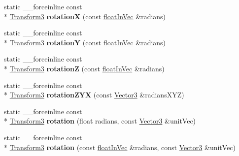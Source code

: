 \begin{DoxyCompactItemize}
\item 
\hypertarget{classVectormath_1_1Aos_1_1Transform3_a81af3b7f1376588d0be13b8efd6a7ff6}{static \-\_\-\-\_\-forceinline const \\*
\hyperlink{classVectormath_1_1Aos_1_1Transform3}{Transform3} {\bfseries rotation\-X} (const \hyperlink{classVectormath_1_1floatInVec}{float\-In\-Vec} \&radians)}\label{classVectormath_1_1Aos_1_1Transform3_a81af3b7f1376588d0be13b8efd6a7ff6}

\item 
\hypertarget{classVectormath_1_1Aos_1_1Transform3_a878ff3e7b662aa1e880efdeea8cb898c}{static \-\_\-\-\_\-forceinline const \\*
\hyperlink{classVectormath_1_1Aos_1_1Transform3}{Transform3} {\bfseries rotation\-Y} (const \hyperlink{classVectormath_1_1floatInVec}{float\-In\-Vec} \&radians)}\label{classVectormath_1_1Aos_1_1Transform3_a878ff3e7b662aa1e880efdeea8cb898c}

\item 
\hypertarget{classVectormath_1_1Aos_1_1Transform3_a79e736358e56620e279f3e31a987da2a}{static \-\_\-\-\_\-forceinline const \\*
\hyperlink{classVectormath_1_1Aos_1_1Transform3}{Transform3} {\bfseries rotation\-Z} (const \hyperlink{classVectormath_1_1floatInVec}{float\-In\-Vec} \&radians)}\label{classVectormath_1_1Aos_1_1Transform3_a79e736358e56620e279f3e31a987da2a}

\item 
\hypertarget{classVectormath_1_1Aos_1_1Transform3_a09ad15ddc02a90b13ba106b283fb20be}{static \-\_\-\-\_\-forceinline const \\*
\hyperlink{classVectormath_1_1Aos_1_1Transform3}{Transform3} {\bfseries rotation\-Z\-Y\-X} (const \hyperlink{classVectormath_1_1Aos_1_1Vector3}{Vector3} \&radians\-X\-Y\-Z)}\label{classVectormath_1_1Aos_1_1Transform3_a09ad15ddc02a90b13ba106b283fb20be}

\item 
\hypertarget{classVectormath_1_1Aos_1_1Transform3_aab49f926267c839814f77979d65c001b}{static \-\_\-\-\_\-forceinline const \\*
\hyperlink{classVectormath_1_1Aos_1_1Transform3}{Transform3} {\bfseries rotation} (float radians, const \hyperlink{classVectormath_1_1Aos_1_1Vector3}{Vector3} \&unit\-Vec)}\label{classVectormath_1_1Aos_1_1Transform3_aab49f926267c839814f77979d65c001b}

\item 
\hypertarget{classVectormath_1_1Aos_1_1Transform3_a219f81c124bbcd8659c01cc6bb64e2ac}{static \-\_\-\-\_\-forceinline const \\*
\hyperlink{classVectormath_1_1Aos_1_1Transform3}{Transform3} {\bfseries rotation} (const \hyperlink{classVectormath_1_1floatInVec}{float\-In\-Vec} \&radians, const \hyperlink{classVectormath_1_1Aos_1_1Vector3}{Vector3} \&unit\-Vec)}\label{classVectormath_1_1Aos_1_1Transform3_a219f81c124bbcd8659c01cc6bb64e2ac}


\end{DoxyCompactItemize}
